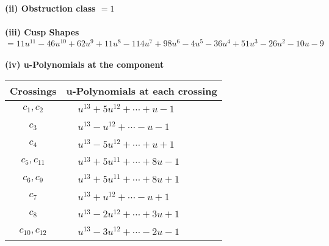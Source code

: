 \documentclass[1p]{elsarticle_modified}
\theoremstyle{definition}
\begin{document}
\flushleft \textbf{(ii) Obstruction class $= 1$}\\~\\
\flushleft \textbf{(iii) Cusp Shapes $= 11 u^{11}-46 u^{10}+62 u^9+11 u^8-114 u^7+98 u^6-4 u^5-36 u^4+51 u^3-26 u^2-10 u-9$}\\~\\
\newpage\renewcommand{\arraystretch}{1}
\flushleft \textbf{(iv) u-Polynomials at the component}\newline \\
\begin{tabular}{m{50pt}|m{274pt}}
Crossings & \hspace{64pt}u-Polynomials at each crossing \\
\hline $$\begin{aligned}c_{1},c_{2}\end{aligned}$$&$\begin{aligned}
&u^{13}+5 u^{12}+\cdots+u-1
\end{aligned}$\\
\hline $$\begin{aligned}c_{3}\end{aligned}$$&$\begin{aligned}
&u^{13}- u^{12}+\cdots- u-1
\end{aligned}$\\
\hline $$\begin{aligned}c_{4}\end{aligned}$$&$\begin{aligned}
&u^{13}-5 u^{12}+\cdots+u+1
\end{aligned}$\\
\hline $$\begin{aligned}c_{5},c_{11}\end{aligned}$$&$\begin{aligned}
&u^{13}+5 u^{11}+\cdots+8 u-1
\end{aligned}$\\
\hline $$\begin{aligned}c_{6},c_{9}\end{aligned}$$&$\begin{aligned}
&u^{13}+5 u^{11}+\cdots+8 u+1
\end{aligned}$\\
\hline $$\begin{aligned}c_{7}\end{aligned}$$&$\begin{aligned}
&u^{13}+u^{12}+\cdots- u+1
\end{aligned}$\\
\hline $$\begin{aligned}c_{8}\end{aligned}$$&$\begin{aligned}
&u^{13}-2 u^{12}+\cdots+3 u+1
\end{aligned}$\\
\hline $$\begin{aligned}c_{10},c_{12}\end{aligned}$$&$\begin{aligned}
&u^{13}-3 u^{12}+\cdots-2 u-1
\end{aligned}$\\
\hline
\end{tabular}\\~\\
\end{document}
